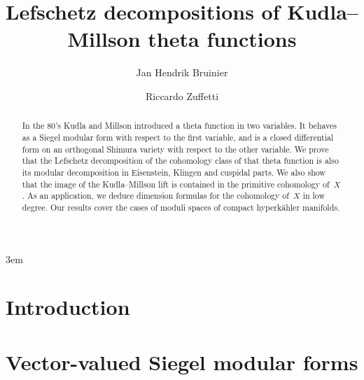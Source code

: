 \documentclass[11pt,a4paper,notitlepage,oneside]{amsart}
\author{Jan Hendrik Bruinier}
\author{Riccardo Zuffetti}
\title{Lefschetz decompositions of Kudla--Millson theta functions}
\begin{document}
	\maketitle
	\begin{abstract}
	In the 80's Kudla and Millson introduced a theta function in two variables.
	It behaves as a Siegel modular form with respect to the first variable, and is a closed differential form on an orthogonal Shimura variety with respect to the other variable.
	We prove that the Lefschetz decomposition of the cohomology class of that theta function is also its modular decomposition in Eisenstein, Klingen and cuspidal parts.
	We also show that the image of the Kudla--Millson lift is contained in the primitive cohomology of~$X$.
	As an application, we deduce dimension formulas for the cohomology of~$X$ in low degree.
	Our results cover the cases of moduli spaces of compact hyperkähler manifolds.
	\end{abstract}
	
	\tableofcontents
	
	\emergencystretch 3em %
	\section{Introduction}\label{sec;outline}
	
	\section{Vector-valued Siegel modular forms}\label{sec;KMtheta}
	
	
\end{document}
